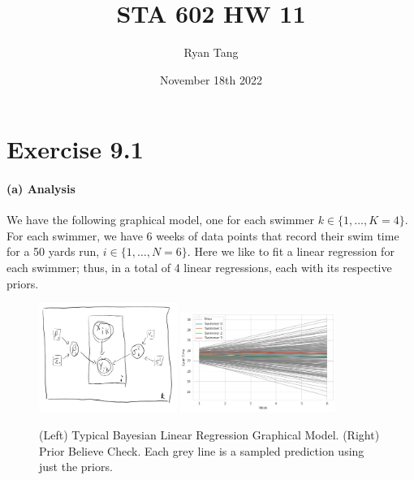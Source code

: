 \documentclass[11pt, letterpaper]{article}
\author{Ryan Tang}
\title{STA 602 HW 11}
\date{November 18th 2022}
\begin{document}
\maketitle

\section{Exercise 9.1}
\paragraph{(a) Analysis}
We have the following graphical model, one for each swimmer $k \in \{1, \dots, K=4\}$. For each swimmer, we have 6 weeks of data points that record their swim time for a 50 yards run, $i \in \{1, \dots, N=6\}$. Here we like to fit a linear regression for each swimmer; thus, in a total of 4 linear regressions, each with its respective priors.
\begin{figure}[!h]
  \centering
  \includegraphics[width=0.4\textwidth]{1.2.graph.png}
  \includegraphics[width=0.45\textwidth]{1.1.png}
  \caption{(Left) Typical Bayesian Linear Regression Graphical Model. (Right) Prior Believe Check. Each grey line is a sampled prediction using just the priors.}
  \label{fig:ex9.1_model}
\end{figure}
\end{document}
